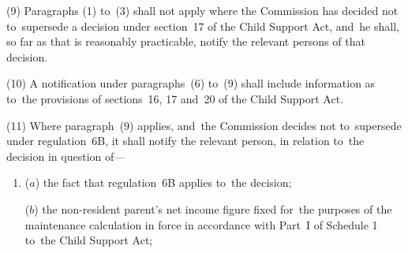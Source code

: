 \documentclass[12pt,a4paper]{article}
\begin{document}
{%
%
%

(9) Paragraphs (1) to~(3) shall not apply where the 
Commission  %
has decided not to~supersede a decision under section~17 of the Child Support Act, and~he shall, so far as that is reasonably practicable, notify the relevant persons of that decision.

(10) A notification under paragraphs~(6) to~(9) shall include information as to~the provisions of sections~16, 17 and~20 of the Child Support Act.

(11) Where paragraph~(9) applies, and~the 
Commission  %
decides not to~supersede under regulation~6B, 
it  %
shall notify the relevant person, in relation to~the decision in question of—
\begin{enumerate}\item[]
($a$) the fact that regulation~6B applies to~the decision;

($b$) the non-resident parent’s net income figure fixed for~the purposes of the maintenance calculation in force in accordance with Part~I of Schedule 1 to~the Child Support Act;


\end{enumerate}}
\end{document}
